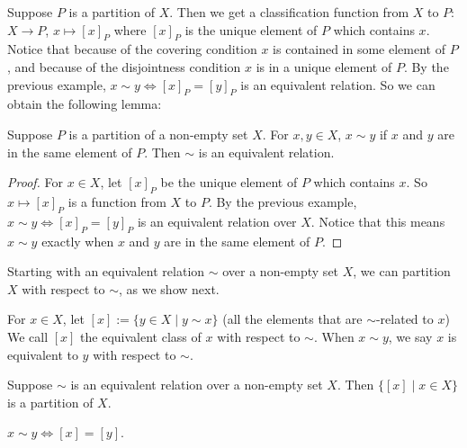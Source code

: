 Suppose $P$ is a partition of $X$. Then we get a classification function
from $X$ to $P$: $X\to P$, $x\mapsto [x]_P$ where $[x]_P$ is the 
unique element of $P$ which contains $x$. Notice that because of
the covering condition $x$ is contained in some element of $P$,
and because of the disjointness condition $x$ is in a unique
element of $P$. By the previous example, $x\sim y\Leftrightarrow [x]_P=[y]_P$
is an equivalent relation. So we can obtain the following lemma:

\begin{lemma}
    Suppose $P$ is a partition of a non-empty set $X$.
    For $x,y\in X$, $x\sim y$ if $x$ and $y$ are in the same element
    of $P$. Then $\sim$ is an equivalent relation.
\end{lemma}

\begin{proof}
    For $x\in X$, let $[x]_P$ be the unique element of $P$
    which contains $x$. So $x\mapsto[x]_P$ is a function from $X$
    to $P$. By the previous example, $x\sim y\Leftrightarrow[x]_P=[y]_P$
    is an equivalent relation over $X$. Notice that this means 
    $x\sim y$ exactly when $x$ and $y$ are in the same element of $P$.
\end{proof}

Starting with an equivalent relation $\sim$ over a non-empty
set $X$, we can partition $X$ with respect to $\sim$,
as we show next.

For $x\in X$, let $[x]:=\{y\in X\mid y\sim x\}$ (all the elements
that are $\sim$-related to $x$) We call $[x]$ the equivalent class
of $x$ with respect to $\sim$. When $x\sim y$, we say $x$ is equivalent to
$y$ with respect to $\sim$.

\begin{proposition}
    Suppose $\sim$ is an equivalent relation over a non-empty
    set $X$. Then $\{[x]\mid x\in X\}$ is a partition of $X$.
\end{proposition}

\begin{lemma}
    $x\sim y\Leftrightarrow [x]=[y]$.
\end{lemma}

